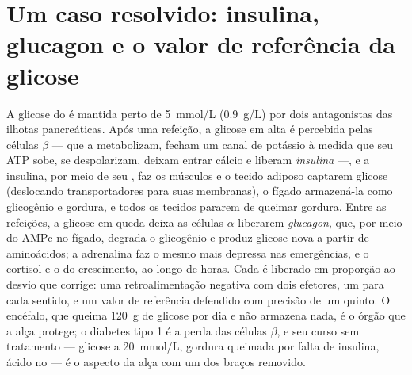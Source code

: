 \section{Um caso resolvido: insulina, glucagon e o valor de referência da glicose}

\begin{proposition}\label{prop:b2:cell-signalling:glucose}
A glicose do  é mantida perto de \qty{5}{mmol/L} (\qty{0.9}{g/L})
por dois  antagonistas das ilhotas pancreáticas. Após uma
refeição, a glicose em alta é percebida pelas células $\beta$ --- que a
metabolizam, fecham um canal de potássio à medida que seu ATP sobe, se
despolarizam, deixam entrar cálcio e liberam \emph{insulina} ---, e a
insulina, por meio de seu , faz os músculos e
o tecido adiposo captarem glicose (deslocando transportadores para suas
membranas), o fígado armazená-la como glicogênio e gordura, e todos os
tecidos pararem de queimar gordura. Entre as refeições, a glicose em
queda deixa as células $\alpha$ liberarem \emph{glucagon}, que, por meio
do AMPc no fígado, degrada o glicogênio e produz glicose nova a partir
de aminoácidos; a adrenalina faz o mesmo mais depressa nas emergências,
e o cortisol e o  do crescimento, ao longo de horas. Cada
 é liberado em proporção ao desvio que corrige: uma
retroalimentação negativa com dois efetores, um para cada sentido, e um
valor de referência defendido com precisão de um quinto. O encéfalo,
que queima \qty{120}{g} de glicose por dia e não armazena nada, é o
órgão que a alça protege; o diabetes tipo 1 é a perda das células
$\beta$, e seu curso sem tratamento --- glicose a
\qty{20}{mmol/L}, gordura queimada por falta de insulina, ácido no
 --- é o aspecto da alça com um dos braços removido.
\end{proposition}

